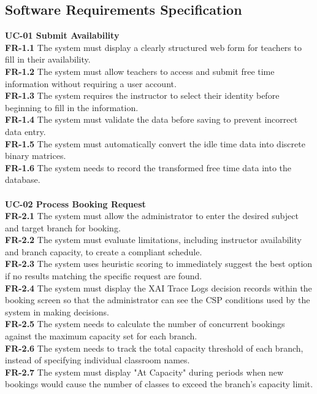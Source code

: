 \subsection{Software Requirements Specification}
\textbf{UC-01 Submit Availability} \\
\textbf{FR-1.1} The system must display a clearly structured web form for teachers to fill in their availability. \\
\textbf{FR-1.2} The system must allow teachers to access and submit free time information without requiring a user account. \\
\textbf{FR-1.3} The system requires the instructor to select their identity before beginning to fill in the information. \\
\textbf{FR-1.4} The system must validate the data before saving to prevent incorrect data entry. \\
\textbf{FR-1.5} The system must automatically convert the idle time data into discrete binary matrices. \\
\textbf{FR-1.6} The system needs to record the transformed free time data into the database. \\
\\
\textbf{UC-02 Process Booking Request} \\
\textbf{FR-2.1} The system must allow the administrator to enter the desired subject and target branch for booking. \\
\textbf{FR-2.2} The system must evaluate limitations, including instructor availability and branch capacity, to create a compliant schedule. \\
\textbf{FR-2.3} The system uses heuristic scoring to immediately suggest the best option if no results matching the specific request are found. \\
\textbf{FR-2.4} The system must display the XAI Trace Logs decision records within the booking screen so that the administrator can see the CSP conditions used by the system in making decisions. \\
\textbf{FR-2.5} The system needs to calculate the number of concurrent bookings against the maximum capacity set for each branch. \\
\textbf{FR-2.6} The system needs to track the total capacity threshold of each branch, instead of specifying individual classroom names. \\
\textbf{FR-2.7} The system must display "At Capacity" during periods when new bookings would cause the number of classes to exceed the branch's capacity limit. \\
